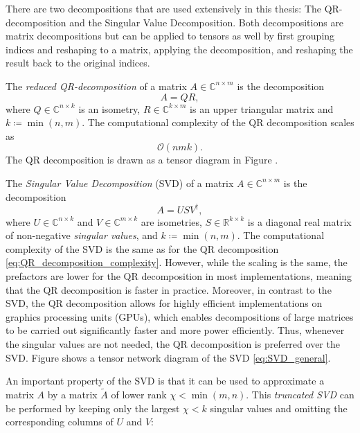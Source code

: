 There are two decompositions that are used extensively in this thesis: The QR-decomposition and the Singular Value Decomposition. Both decompositions are matrix decompositions but can be applied to tensors as well by first grouping indices and reshaping to a matrix, applying the decomposition, and reshaping the result back to the original indices. \par
The \textit{reduced QR-decomposition} of a matrix $A \in \mathbb{C}^{n\times m}$ is the decomposition
\begin{equation}
	\label{eq:QR_decomposition_general}
	A = QR,
\end{equation}
where $Q\in\mathbb{C}^{n\times k}$ is an isometry, $R\in\mathbb{C}^{k\times m}$ is an upper triangular matrix and $k \coloneqq \min(n, m)$. The computational complexity of the QR decomposition scales as
\begin{equation}
	\label{eq:QR_decomposition_complexity}
	\mathcal{O}\left(nmk\right).
\end{equation}
The QR decomposition is drawn as a tensor diagram in Figure . \par
The \textit{Singular Value Decomposition} (SVD) of a matrix $A \in \mathbb{C}^{n\times m}$ is the decomposition
\begin{equation}
	\label{eq:SVD_general}
	A = USV^\dagger,
\end{equation}
where $U\in\mathbb{C}^{n\times k}$ and $V\in\mathbb{C}^{m\times k}$ are isometries, $S\in\mathbb{R}^{k\times k}$ is a diagonal real matrix of non-negative \textit{singular values}, and $k \coloneqq \min(n, m)$. The computational complexity of the SVD is the same as for the QR decomposition \eqref{eq:QR_decomposition_complexity}. However, while the scaling is the same, the prefactors are lower for the QR decomposition in most implementations, meaning that the QR decomposition is faster in practice. Moreover, in contrast to the SVD, the QR decomposition allows for highly efficient implementations on graphics processing units (GPUs), which enables decompositions of large matrices to be carried out significantly faster and more power efficiently. Thus, whenever the singular values are not needed, the QR decomposition is preferred over the SVD. Figure  shows a tensor network diagram of the SVD \eqref{eq:SVD_general}. \par
An important property of the SVD is that it can be used to approximate a matrix $A$ by a matrix $\tilde{A}$ of lower rank $\chi < \min(m, n)$. This \textit{truncated SVD} can be performed by keeping only the largest $\chi < k$ singular values and omitting the corresponding columns of $U$ and $V$:
